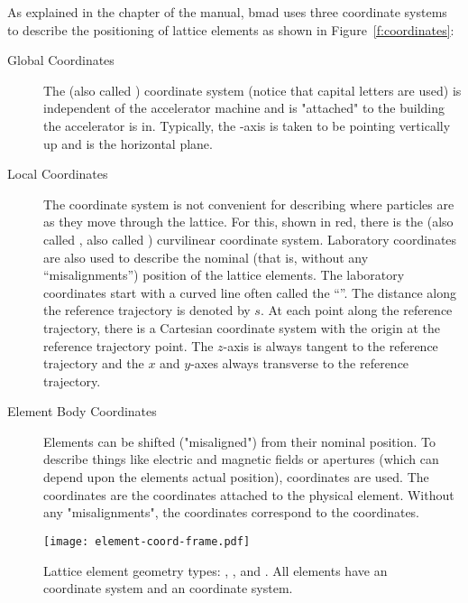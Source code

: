 \documentclass{hitec}     %
\begin{document}
{As explained in the  chapter of the \bmad manual, bmad uses three coordinate
systems to describe the positioning of lattice elements as shown in Figure~\ref{f:coordinates}:
\begin{description}
\item[Global Coordinates] \Newline
The   (also called ) coordinate system (notice that capital
letters are used) is independent of the accelerator machine and is "attached" to the building the
accelerator is in. Typically, the -axis is taken to be pointing vertically up and 
is the horizontal plane.
%
\item[Local Coordinates] \Newline
The  coordinate system is not convenient for describing where particles are as they move
through the lattice. For this, shown in red, there is the  (also called ,
also called ) curvilinear coordinate system. Laboratory coordinates are also used to
describe the nominal (that is, without any ``misalignments'') position of the lattice elements. The
laboratory coordinates start with a curved line often called the ``''. The
distance along the reference trajectory is denoted by $s$. At each point along the reference
trajectory, there is a Cartesian  coordinate system with the origin at the reference
trajectory point. The $z$-axis is always tangent to the reference trajectory and the $x$ and
$y$-axes always transverse to the reference trajectory.
%
\item[Element Body Coordinates] \Newline
Elements can be shifted ("misaligned") from their nominal position. To describe things like electric
and magnetic fields or apertures (which can depend upon the elements actual position), 
coordinates are used.  The  coordinates are the coordinates attached to the
physical element. Without any "misalignments", the  coordinates correspond to the
 coordinates.
\end{description}

\begin{figure}[tb]
  \centering
  \texttt{[image: element-coord-frame.pdf]}
  \caption{Lattice element geometry types: , , and . All elements have an 
 coordinate system and an  coordinate system.}
  \label{f:body.types}
\end{figure}

}
\end{document}
